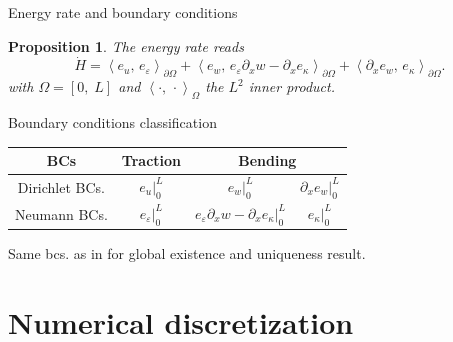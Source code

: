 \documentclass[serif]{beamer} %
\newcommand{\inner}[3][]{\ensuremath{\left\langle #2, \, #3 \right\rangle_{#1}}}
\newtheorem{proposition}{Proposition}
\begin{document}
\begin{frame}{Energy rate and boundary conditions}
	
	\begin{proposition}{The energy rate reads}
		\begin{equation*}
			\dot{H} = \inner[\partial\Omega]{e_u}{e_\varepsilon} + \inner[\partial\Omega]{e_w}{e_\varepsilon \partial_x w -\partial_x e_\kappa} + \inner[\partial\Omega]{\partial_x e_w}{e_\kappa}.
		\end{equation*}
	with $\Omega = [0, \; L]$ and $\inner[\Omega]{\cdot}{\cdot}$ the $L^2$ inner product.
	\end{proposition}

\begin{table}[h]
	Boundary conditions classification
	\centering
	\begin{tabular}{c|c|c|c}
		\hline 
		BCs & Traction & \multicolumn{2}{c}{Bending} \\ 
		\hline 
		Dirichlet BCs. & $e_u\vert_0^L$ & $e_w\vert_0^L$  & $\partial_x e_w\vert_0^L$  \\
		Neumann BCs. & $e_\varepsilon\vert_0^L$ & $e_\varepsilon \partial_x w -\partial_x e_\kappa\vert_0^L$ & $e_\kappa\vert_0^L$ \\ 
		\hline 
	\end{tabular} 
\end{table}

Same bcs. as in \cite{puel1996} for global existence and uniqueness result.
\end{frame}


\section{Numerical discretization}
\end{document}
